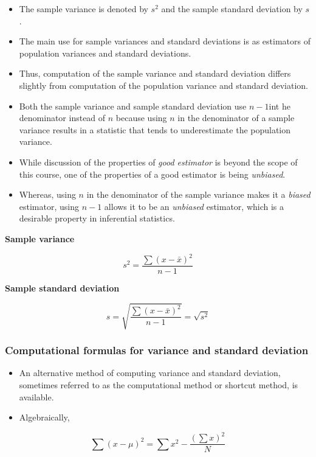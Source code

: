 \documentclass[]{book}
\begin{document}
\begin{itemize}
\item
  The sample variance is denoted by \(s^2\) and the sample standard deviation by \(s\).
\item
  The main use for sample variances and standard deviations is as estimators of population variances and standard deviations.
\item
  Thus, computation of the sample variance and standard deviation differs slightly from computation of the population variance and standard deviation.
\item
  Both the sample variance and sample standard deviation use \(n-1\)int he denominator instead of \(n\) because using \(n\) in the denominator of a sample variance results in a statistic that tends to underestimate the population variance.
\item
  While discussion of the properties of \emph{good estimator} is beyond the scope of this course, one of the properties of a good estimator is being \emph{unbiased}.
\item
  Whereas, using \(n\) in the denominator of the sample variance makes it a \emph{biased} estimator, using \(n-1\) allows it to be an \emph{unbiased} estimator, which is a desirable property in inferential statistics.
\end{itemize}

\textbf{Sample variance}

\[s^2 = \frac{\sum{(x-\bar{x})^2}}{n-1}\]

\textbf{Sample standard deviation}

\[s = \sqrt{\frac{\sum{(x-\bar{x})^2}}{n-1}}= \sqrt{s^2}\]

\hypertarget{computational-formulas-for-variance-and-standard-deviation}{%
\subsubsection{Computational formulas for variance and standard deviation}\label{computational-formulas-for-variance-and-standard-deviation}}

\begin{itemize}
\item
  An alternative method of computing variance and standard deviation, sometimes referred to as the computational method or shortcut method, is available.
\item
  Algebraically,
\end{itemize}

\[\sum{(x-\mu)^2}= \sum{x^2}- \frac{(\sum x)^2}{N}\]
\end{document}
